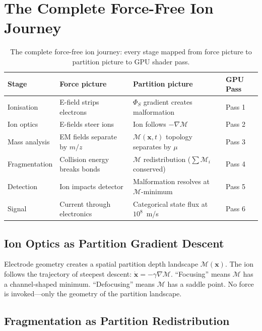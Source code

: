 \documentclass[11pt,twocolumn,a4paper]{article}
\theoremstyle{definition}
\theoremstyle{remark}
\newcommand{\Depth}{\mathcal{M}}
\newcommand{\partinert}{\mu}
\newcommand{\Spotential}{\Phi_S}
\begin{document}
\section{The Complete Force-Free Ion Journey}
\label{sec:journey}

\begin{table}[!htbp]
\centering
\caption{The complete force-free ion journey: every stage mapped from force picture to partition picture to GPU shader pass.}
\label{tab:journey}
\small
\begin{tabular}{llll}
\toprule
\textbf{Stage} & \textbf{Force picture} & \textbf{Partition picture} & \textbf{GPU Pass} \\
\midrule
Ionisation & E-field strips electrons & $\Spotential$ gradient creates malformation & Pass 1 \\
Ion optics & E-fields steer ions & Ion follows $-\nabla\Depth$ & Pass 2 \\
Mass analysis & EM fields separate by $m/z$ & $\Depth(\mathbf{x},t)$ topology separates by $\partinert$ & Pass 3 \\
Fragmentation & Collision energy breaks bonds & $\Depth$ redistribution ($\sum\Depth_i$ conserved) & Pass 4 \\
Detection & Ion impacts detector & Malformation resolves at $\Depth$-minimum & Pass 5 \\
Signal & Current through electronics & Categorical state flux at $10^8$~m/s & Pass 6 \\
\bottomrule
\end{tabular}
\end{table}

\subsection{Ion Optics as Partition Gradient Descent}

Electrode geometry creates a spatial partition depth landscape $\Depth(\mathbf{x})$. The ion follows the trajectory of steepest descent: $\dot{\mathbf{x}} = -\gamma\nabla\Depth$. ``Focusing'' means $\Depth$ has a channel-shaped minimum. ``Defocusing'' means $\Depth$ has a saddle point. No force is invoked---only the geometry of the partition landscape.

\subsection{Fragmentation as Partition Redistribution}
\end{document}
